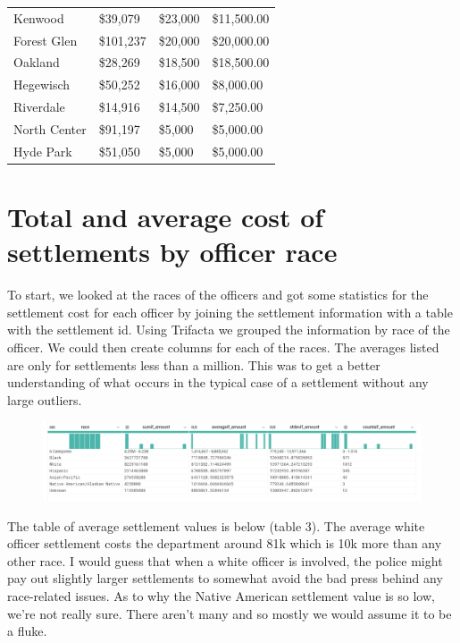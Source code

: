 \documentclass{article}
\begin{document}
\begin{table}[h!]
\begin{tabular}{|l|l|l|l|}
Kenwood                & \$39,079       & \$23,000          & \$11,500.00     \\
Forest Glen            & \$101,237      & \$20,000          & \$20,000.00     \\
Oakland                & \$28,269       & \$18,500          & \$18,500.00     \\
Hegewisch              & \$50,252       & \$16,000          & \$8,000.00      \\
Riverdale              & \$14,916       & \$14,500          & \$7,250.00      \\
North Center           & \$91,197       & \$5,000           & \$5,000.00      \\
Hyde Park              & \$51,050       & \$5,000           & \$5,000.00     \\
\hline
\end{tabular}
\end{table}


\FloatBarrier
\pagebreak

\newpage


\section{Total and average cost of settlements by officer race}

To start, we looked at the races of the officers and got some statistics for the settlement cost for each officer by joining the settlement information with a table with the settlement id. Using Trifacta we grouped the information by race of the officer. We could then create columns for each of the races. The averages listed are only for settlements less than a million. This was to get a better understanding of what occurs in the typical case of a settlement without any large outliers.

\begin{figure}[h!]
\includegraphics[width=\textwidth]{RaceTable.PNG}
\end{figure}

The table of average settlement values is below (table 3). The average white officer settlement costs the department around 81k which is 10k more than any other race. I would guess that when a white officer is involved, the police might pay out slightly larger settlements to somewhat avoid the bad press behind any race-related issues. As to why the Native American settlement value is so low, we're not really sure. There aren't many and so mostly we would assume it to be a fluke.
\end{document}
